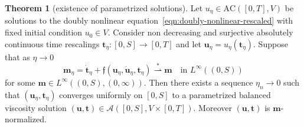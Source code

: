 \documentclass[letterpaper,oneside]{amsart}
\numberwithin{equation}{section}
\theoremstyle{definition}
\newtheorem{thm}[prop]{Theorem}
\begin{document}
\begin{thm}[existence of parametrized solutions]
Let $u_\eta\in\text{AC}([0,T],V)$ be solutions to the doubly nonlinear equation~\eqref{eqn:doubly-nonlinear-rescaled} with fixed initial condition $u_0\in V$. Consider non decreasing and surjective absolutely continuous time rescalings $\boldsymbol{t}_\eta\colon[0,S]\to[0,T]$ and let $\boldsymbol{u}_\eta=u_\eta(\boldsymbol{t}_\eta)$. Suppose that as $\eta\to0$
\begin{equation}
\label{eqn:normalization-hp}
\boldsymbol{m}_\eta=\dot{\boldsymbol{t}}_\eta+\mathfrak{f}(\boldsymbol{u}_\eta,\dot{\boldsymbol{u}}_\eta,\boldsymbol{t}_\eta)\overset{*}{\rightharpoonup}\boldsymbol{m}\quad\text{in $L^\infty((0,S))$}
\end{equation}
for some $\boldsymbol{m}\in L^\infty((0,S),(0,\infty))$. Then there exists a sequence $\eta_n\to0$ such that $(\boldsymbol{u}_\eta,\boldsymbol{t}_\eta)$ converges uniformly on $[0,S]$ to a parametrized balanced viscosity solution $(\boldsymbol{u},\boldsymbol{t})\in\mathscr{A}([0,S],V\times[0,T])$. Moreover $(\boldsymbol{u},\boldsymbol{t})$ is $\boldsymbol{m}$-normalized.
\end{thm}
\end{document}
